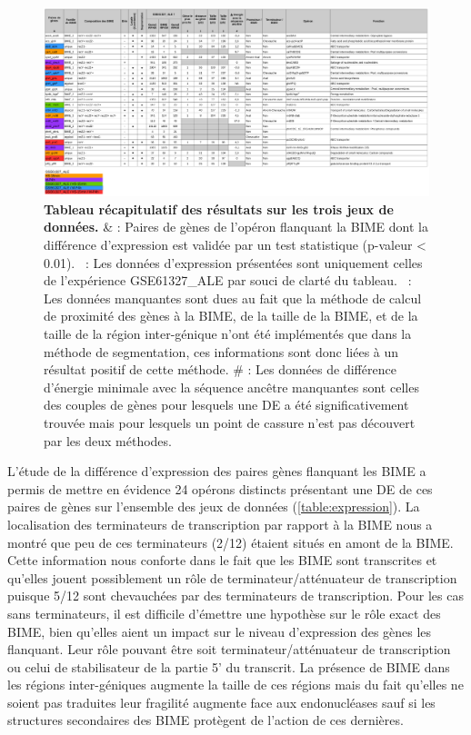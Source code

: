 \documentclass[12pt,a4paper]{report}
\begin{document}
\begin{onehalfspace}
\begin{figure}
\centerline{\includegraphics[scale=0.85]{figures/synthese_french.png}}
\caption{\textbf{Tableau récapitulatif des résultats sur les trois jeux de données.} \& : Paires de gènes de l'opéron flanquant la BIME dont la différence d'expression est validée par un test statistique (p-valeur < 0.01). \dag~: Les données d'expression présentées sont uniquement celles de l'expérience GSE61327\_ALE par souci de clarté du tableau. \ddag~: Les données manquantes sont dues au fait que la méthode de calcul de proximité des gènes à la BIME, de la taille de la BIME, et de la taille de la région inter-génique n'ont été implémentés que dans la méthode de segmentation, ces informations sont donc liées à un résultat positif de cette méthode. \# : Les données de différence d'énergie minimale avec la séquence ancêtre manquantes sont celles des couples de gènes pour lesquels une DE a été significativement trouvée mais pour lesquels un point de cassure n'est pas découvert par les deux méthodes.}
\label{fig:bilan}
\end{figure}

L'étude de la différence d'expression des paires gènes flanquant les BIME a permis de mettre en évidence 24 opérons distincts présentant une DE de ces paires de gènes sur l'ensemble des jeux de données (\autoref{table:expression}). La localisation des terminateurs de transcription par rapport à la BIME nous a montré que peu de ces terminateurs (2/12) étaient situés en amont de la BIME. Cette information nous conforte dans le fait que les BIME sont transcrites et qu'elles jouent possiblement un rôle de terminateur/atténuateur de transcription puisque 5/12 sont chevauchées par des terminateurs de transcription. Pour les cas sans terminateurs, il est difficile d'émettre une hypothèse sur le rôle exact des BIME, bien qu'elles aient un impact sur le niveau d'expression des gènes les flanquant. Leur rôle pouvant être soit terminateur/atténuateur de transcription ou celui de stabilisateur de la partie 5' du transcrit. La présence de BIME dans les régions inter-géniques augmente la taille de ces régions mais du fait qu'elles ne soient pas traduites leur fragilité augmente face aux endonucléases sauf si les structures secondaires des BIME protègent de l'action de ces dernières.


\end{onehalfspace}
\end{document}
